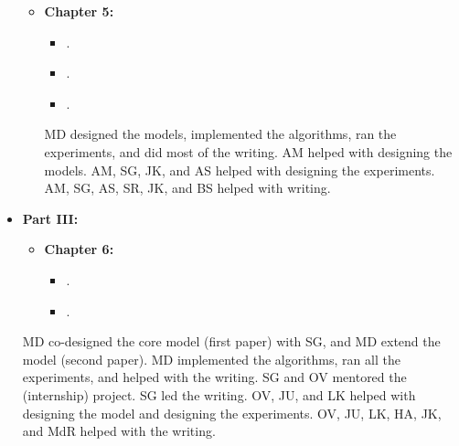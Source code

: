 \begin{itemize}
\begin{itemize}
            \item[] \textbf{Chapter 5:} \emph{}
            \begin{itemize}[label=\textbullet] 
                \item {}.
                \item {}.
                \item {}.
            \end{itemize}
            {\footnotesize{MD designed the models, implemented the algorithms, ran the experiments, and did most of the writing. 
            AM helped with designing the models. AM, SG, JK, and AS helped with designing the experiments. AM, SG, AS, SR, JK, and BS helped with writing.}\medskip}
        \end{itemize}
%   
    \item[] \textbf{Part III:} \emph{}
%  
        \begin{itemize}
            \setlength{\itemindent}{-33pt}
            \item[] \textbf{Chapter 6:} \emph{}
            \begin{itemize}[label=\textbullet] 
                \item {}.
                \item {}.
            \end{itemize}
        \end{itemize}
        {\footnotesize{MD co-designed the core model (first paper) with SG, and MD extend the model (second paper). MD implemented the algorithms, ran all the experiments, and helped with the writing. SG and OV mentored the (internship) project. SG led the writing. OV, JU, and LK helped with designing the model and designing the experiments. OV, JU, LK, HA, JK, and MdR helped with the writing.}\medskip}
%
\end{itemize}

